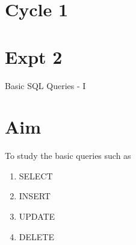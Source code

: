 \documentclass[13pt,oneside]{book}
\begin{document}
	\section*{Cycle 1}
	\section*{Expt 2}
	\begin{center}
		\Large{Basic SQL Queries - I}
	\end{center}
	
	\section*{Aim}
	\large{To study the basic queries such as
		\begin{enumerate}
			\item SELECT
			\item INSERT
			\item UPDATE
			\item DELETE
		\end{enumerate}
	}
	
\end{document}
